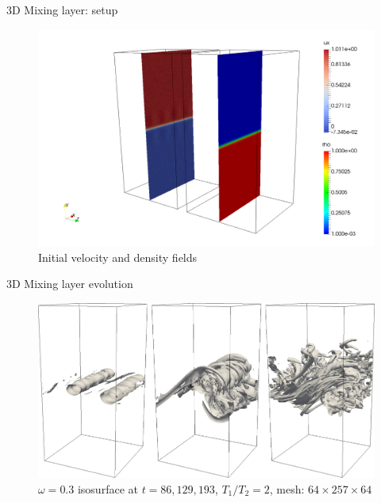 \documentclass[presentation]{beamer}
\begin{document}
\begin{frame}[label=sec-4]{3D Mixing layer: setup}
\begin{figure}[htb]
\centering
\includegraphics[width=0.9\linewidth]{./figures/r1000-t0.png}
\caption{Initial velocity and density fields}
\end{figure}
\end{frame}

\begin{frame}[label=sec-5]{3D Mixing layer evolution}
\begin{figure}[htb]
\centering
\includegraphics[width=0.9\linewidth]{./figures/r2-t86-129-193-w03.png}
\caption{$\omega=0.3$ isosurface at $t=86,129,193$, $T_1 / T_2 = 2$, mesh: $64\times257\times64$}
\end{figure}
\end{frame}
\end{document}
